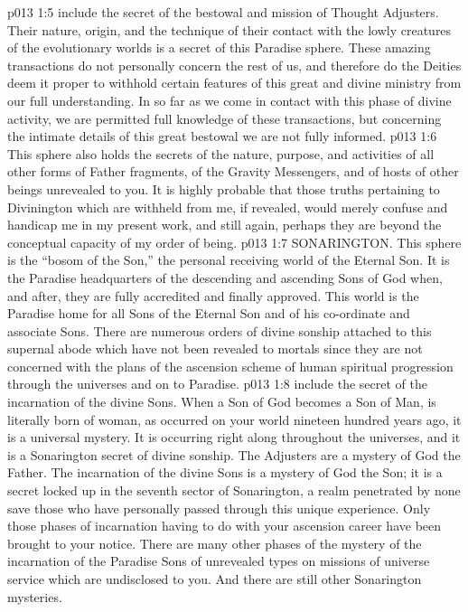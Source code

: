 \pc \vs p013 1:5  include the secret of the bestowal and mission of Thought Adjusters. Their nature, origin, and the technique of their contact with the lowly creatures of the evolutionary worlds is a secret of this Paradise sphere. These amazing transactions do not personally concern the rest of us, and therefore do the Deities deem it proper to withhold certain features of this great and divine ministry from our full understanding. In so far as we come in contact with this phase of divine activity, we are permitted full knowledge of these transactions, but concerning the intimate details of this great bestowal we are not fully informed.
\vs p013 1:6 This sphere also holds the secrets of the nature, purpose, and activities of all other forms of Father fragments, of the Gravity Messengers, and of hosts of other beings unrevealed to you. It is highly probable that those truths pertaining to Divinington which are withheld from me, if revealed, would merely confuse and handicap me in my present work, and still again, perhaps they are beyond the conceptual capacity of my order of being.
\pc \vs p013 1:7 \bibnobreakspace SONARINGTON. This sphere is the “bosom of the Son,” the personal receiving world of the Eternal Son. It is the Paradise headquarters of the descending and ascending Sons of God when, and after, they are fully accredited and finally approved. This world is the Paradise home for all Sons of the Eternal Son and of his co\hyp{}ordinate and associate Sons. There are numerous orders of divine sonship attached to this supernal abode which have not been revealed to mortals since they are not concerned with the plans of the ascension scheme of human spiritual progression through the universes and on to Paradise.
\pc \vs p013 1:8  include the secret of the incarnation of the divine Sons. When a Son of God becomes a Son of Man, is literally born of woman, as occurred on your world nineteen hundred years ago, it is a universal mystery. It is occurring right along throughout the universes, and it is a Sonarington secret of divine sonship. The Adjusters are a mystery of God the Father. The incarnation of the divine Sons is a mystery of God the Son; it is a secret locked up in the seventh sector of Sonarington, a realm penetrated by none save those who have personally passed through this unique experience. Only those phases of incarnation having to do with your ascension career have been brought to your notice. There are many other phases of the mystery of the incarnation of the Paradise Sons of unrevealed types on missions of universe service which are undisclosed to you. And there are still other Sonarington mysteries.
